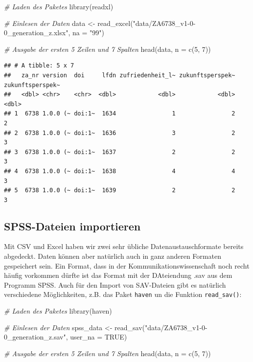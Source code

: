 \documentclass[
]{book}
\newenvironment{Shaded}{\begin{snugshade}}{\end{snugshade}}
\newcommand{\AttributeTok}[1]{\textcolor[rgb]{0.77,0.63,0.00}{#1}}
\newcommand{\CommentTok}[1]{\textcolor[rgb]{0.56,0.35,0.01}{\textit{#1}}}
\newcommand{\ConstantTok}[1]{\textcolor[rgb]{0.00,0.00,0.00}{#1}}
\newcommand{\DecValTok}[1]{\textcolor[rgb]{0.00,0.00,0.81}{#1}}
\newcommand{\FunctionTok}[1]{\textcolor[rgb]{0.00,0.00,0.00}{#1}}
\newcommand{\NormalTok}[1]{#1}
\newcommand{\OtherTok}[1]{\textcolor[rgb]{0.56,0.35,0.01}{#1}}
\newcommand{\StringTok}[1]{\textcolor[rgb]{0.31,0.60,0.02}{#1}}
\begin{document}
\begin{Shaded}
\begin{Highlighting}[]
\CommentTok{\# Laden des Paketes}
\FunctionTok{library}\NormalTok{(readxl)}

\CommentTok{\# Einlesen der Daten}
\NormalTok{data }\OtherTok{\textless{}{-}} \FunctionTok{read\_excel}\NormalTok{(}\StringTok{"data/ZA6738\_v1{-}0{-}0\_generation\_z.xlsx"}\NormalTok{, }\AttributeTok{na =} \StringTok{"99"}\NormalTok{)}

\CommentTok{\# Ausgabe der ersten 5 Zeilen und 7 Spalten}
\FunctionTok{head}\NormalTok{(data, }\AttributeTok{n =} \FunctionTok{c}\NormalTok{(}\DecValTok{5}\NormalTok{, }\DecValTok{7}\NormalTok{))}
\end{Highlighting}
\end{Shaded}

\begin{verbatim}
## # A tibble: 5 x 7
##   za_nr version  doi     lfdn zufriedenheit_l~ zukunftsperspek~ zukunftsperspek~
##   <dbl> <chr>    <chr>  <dbl>            <dbl>            <dbl>            <dbl>
## 1  6738 1.0.0 (~ doi:1~  1634                1                2                2
## 2  6738 1.0.0 (~ doi:1~  1636                3                2                3
## 3  6738 1.0.0 (~ doi:1~  1637                2                2                3
## 4  6738 1.0.0 (~ doi:1~  1638                4                4                3
## 5  6738 1.0.0 (~ doi:1~  1639                2                2                3
\end{verbatim}

\hypertarget{spss-dateien-importieren}{%
\subsection{SPSS-Dateien importieren}\label{spss-dateien-importieren}}

Mit CSV und Excel haben wir zwei sehr übliche Datenaustauschformate bereits abgedeckt. Daten können aber natürlich auch in ganz anderen Formaten gespeichert sein. Ein Format, dass in der Kommunikationswissenschaft noch recht häufig vorkommen dürfte ist das Format mit der DAteiendung .sav aus dem Programm SPSS. Auch für den Import von SAV-Dateien gibt es natürlich verschiedene Möglichkeiten, z.B. das Paket \texttt{haven} un die Funktion \texttt{read\_sav()}:

\begin{Shaded}
\begin{Highlighting}[]
\CommentTok{\# Laden des Paketes}
\FunctionTok{library}\NormalTok{(haven)}

\CommentTok{\# Einlesen der Daten}
\NormalTok{spss\_data }\OtherTok{\textless{}{-}} \FunctionTok{read\_sav}\NormalTok{(}\StringTok{"data/ZA6738\_v1{-}0{-}0\_generation\_z.sav"}\NormalTok{, }\AttributeTok{user\_na =} \ConstantTok{TRUE}\NormalTok{)}

\CommentTok{\# Ausgabe der ersten 5 Zeilen und 7 Spalten}
\FunctionTok{head}\NormalTok{(data, }\AttributeTok{n =} \FunctionTok{c}\NormalTok{(}\DecValTok{5}\NormalTok{, }\DecValTok{7}\NormalTok{))}
\end{Highlighting}
\end{Shaded}
\end{document}
